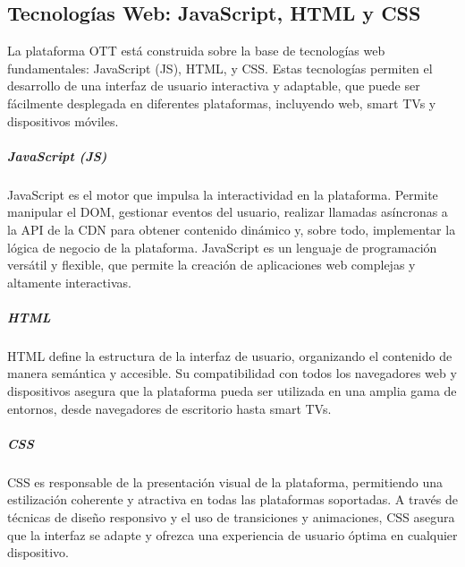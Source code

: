 
\subsection{Tecnologías Web: JavaScript, HTML y CSS}
\label{sec:TechWeb}

La plataforma OTT está construida sobre la base de tecnologías web fundamentales: JavaScript (JS), 
HTML, y CSS. Estas tecnologías permiten el desarrollo de una interfaz de usuario interactiva y 
adaptable, que puede ser fácilmente desplegada en diferentes plataformas, incluyendo web, smart TVs 
y dispositivos móviles.

\subparagraph{JavaScript (JS)}
JavaScript es el motor que impulsa la interactividad en la plataforma. Permite manipular el DOM, 
gestionar eventos del usuario,  realizar llamadas asíncronas a la API de la CDN para obtener contenido 
dinámico y, sobre todo, implementar la lógica de negocio de la plataforma. JavaScript es un lenguaje
de programación versátil y flexible, que permite la creación de aplicaciones web complejas y
altamente interactivas.

\subparagraph{HTML}
HTML define la estructura de la interfaz de usuario, organizando el contenido de manera semántica y 
accesible. Su compatibilidad con todos los navegadores web y dispositivos asegura que la plataforma 
pueda ser utilizada en una amplia gama de entornos, desde navegadores de escritorio hasta smart TVs.

\subparagraph{CSS}
CSS es responsable de la presentación visual de la plataforma, permitiendo una estilización coherente 
y atractiva en todas las plataformas soportadas. A través de técnicas de diseño responsivo y el uso de 
transiciones y animaciones, CSS asegura que la interfaz se adapte y ofrezca una experiencia de usuario 
óptima en cualquier dispositivo.